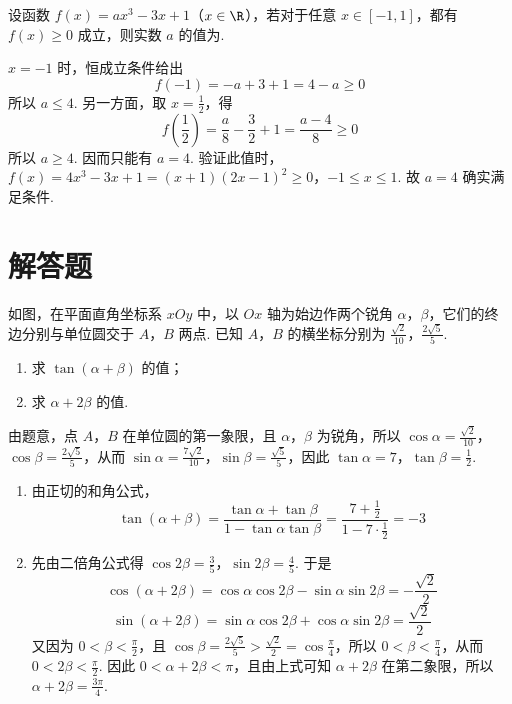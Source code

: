 \begin{problem}
设函数 \(f(x) = ax^3 - 3x + 1\)（\(x \in \R\)），若对于任意 \(x \in [-1, 1]\)，都有 \(f(x) \geqslant 0\) 成立，则实数 \(a\) 的值为\fillinblank{}.
\end{problem}


\begin{solution}
\(x=-1\) 时，恒成立条件给出
\[
f(-1)=-a+3+1=4-a\geqslant0
\]
所以 \(a\leqslant4\). 另一方面，取 \(x=\frac12\)，得
\[
f\left(\frac12\right)=\frac{a}{8}-\frac32+1=\frac{a-4}{8}\geqslant0
\]
所以 \(a\geqslant4\). 因而只能有 \(a=4\). 验证此值时，
\(f(x)=4x^3-3x+1=(x+1)(2x-1)^2\geqslant0\)，\(-1\leqslant x\leqslant1\).
故 \(a=4\) 确实满足条件.
\end{solution}

\section{解答题}

\begin{problem}
如图，在平面直角坐标系 \(xOy\) 中，以 \(Ox\) 轴为始边作两个锐角 \(\alpha\)，\(\beta\)，它们的终边分别与单位圆交于 \(A\)，\(B\) 两点. 已知 \(A\)，\(B\) 的横坐标分别为 \(\frac{\sqrt{2}}{10}\)，\(\frac{2\sqrt{5}}{5}\).

\begin{enumerate}
\item 求 \(\tan(\alpha + \beta)\) 的值；
\item 求 \(\alpha + 2\beta\) 的值.
\end{enumerate}

\end{problem}

\begin{solution}
由题意，点 \(A\)，\(B\) 在单位圆的第一象限，且 \(\alpha\)，\(\beta\) 为锐角，所以
\(\cos\alpha=\frac{\sqrt{2}}{10}\)，\(\cos\beta=\frac{2\sqrt{5}}{5}\)，从而
\(\sin\alpha=\frac{7\sqrt{2}}{10}\)，\(\sin\beta=\frac{\sqrt{5}}{5}\)，因此
\(\tan\alpha=7\)，\(\tan\beta=\frac{1}{2}\).

\begin{enumerate}
\item 由正切的和角公式，
\[
\tan(\alpha+\beta)=\frac{\tan\alpha+\tan\beta}{1-\tan\alpha\tan\beta}=\frac{7+\frac{1}{2}}{1-7\cdot\frac{1}{2}}=-3
\]

\item 先由二倍角公式得 \(\cos 2\beta=\frac{3}{5}\)，\(\sin 2\beta=\frac{4}{5}\). 于是
\[
\cos(\alpha+2\beta)=\cos\alpha\cos2\beta-\sin\alpha\sin2\beta=-\frac{\sqrt{2}}{2}
\]
\[
\sin(\alpha+2\beta)=\sin\alpha\cos2\beta+\cos\alpha\sin2\beta=\frac{\sqrt{2}}{2}
\]
又因为 \(0<\beta<\frac{\pi}{2}\)，且
\(\cos\beta=\frac{2\sqrt{5}}{5}>\frac{\sqrt{2}}{2}=\cos\frac{\pi}{4}\)，所以
\(0<\beta<\frac{\pi}{4}\)，从而 \(0<2\beta<\frac{\pi}{2}\). 因此
\(0<\alpha+2\beta<\pi\)，且由上式可知 \(\alpha+2\beta\) 在第二象限，所以 \(\alpha+2\beta=\frac{3\pi}{4}\).
\end{enumerate}
\end{solution}

